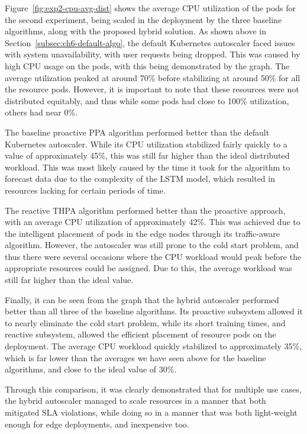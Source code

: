 Figure~\ref{fig:exp2-cpu-avg-dist} shows the average CPU utilization of the pods for the second experiment, being scaled in the deployment by the three baseline algorithms, along with the proposed hybrid solution. As shown above in Section~\ref{subsec:ch6-default-algo}, the default Kubernetes autoscaler faced issues with system unavailability, with user requests being dropped. This was caused by high CPU usage on the pods, with this being demonstrated by the graph. The average utilization peaked at around 70\% before stabilizing at around 50\% for all the resource pods. However, it is important to note that these resources were not distributed equitably, and thus while some pods had close to 100\% utilization, others had near 0\%.\par

The baseline proactive PPA algorithm performed better than the default Kubernetes autoscaler. While its CPU utilization stabilized fairly quickly to a value of approximately 45\%, this was still far higher than the ideal distributed workload. This was most likely caused by the time it took for the algorithm to forecast data due to the complexity of the LSTM model, which resulted in resources lacking for certain periods of time.\par

The reactive THPA algorithm performed better than the proactive approach, with an average CPU utilization of approximately 42\%. This was achieved due to the intelligent placement of pods in the edge nodes through its traffic-aware algorithm. However, the autoscaler was still prone to the cold start problem, and thus there were several occasions where the CPU workload would peak before the appropriate resources could be assigned. Due to this, the average workload was still far higher than the ideal value.\par

Finally, it can be seen from the graph that the hybrid autoscaler performed better than all three of the baseline algorithms. Its proactive subsystem allowed it to nearly eliminate the cold start problem, while its short training times, and reactive subsystem, allowed the efficient placement of resource pods on the deployment. The average CPU workload quickly stabilized to approximately 35\%, which is far lower than the averages we have seen above for the baseline algorithms, and close to the ideal value of 30\%.\par

Through this comparison, it was clearly demonstrated that for multiple use cases, the hybrid autoscaler managed to scale resources in a manner that both mitigated SLA violations, while doing so in a manner that was both light-weight enough for edge deployments, and inexpensive too.\par

